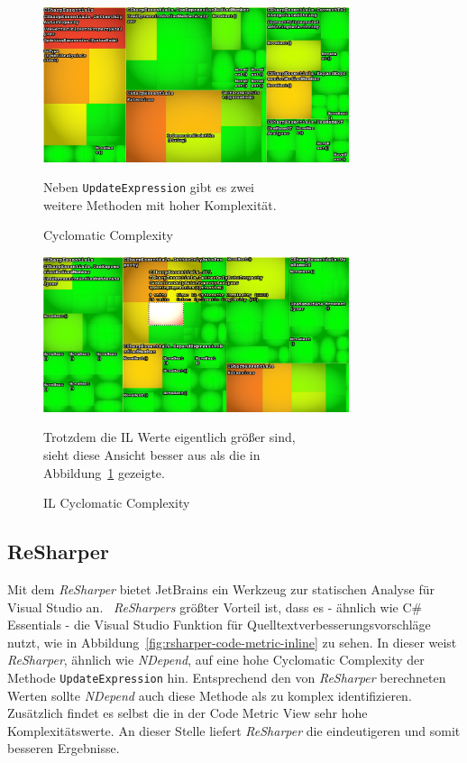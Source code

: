 \begin{figure}[!ht]
	\centering
	\includegraphics[width=0.8\textwidth]{images/nd-cyclomatic-complexity.png}
	\caption{Cyclomatic Complexity}
	\vspace{0.1cm}
	Neben \texttt{UpdateExpression} gibt es zwei\\ weitere Methoden mit hoher Komplexität.
	\label{fig:nd-cyclomatic-complexity}
\end{figure}

\begin{figure}[!ht]
	\centering
	\includegraphics[width=0.8\textwidth]{images/nd-il-cyclomatic-complexity.png}
	\caption{IL Cyclomatic Complexity}
	\vspace{0.1cm}
	Trotzdem die IL Werte eigentlich größer sind, \\
	sieht diese Ansicht besser aus als die in \\ Abbildung~\ref{fig:nd-cyclomatic-complexity} gezeigte.
	\label{fig:nd-il-cyclomatic-complexity}
\end{figure}

\subsection{ReSharper}
Mit dem \emph{ReSharper} bietet JetBrains ein Werkzeug zur statischen Analyse für Visual Studio an.~\cite{resharper} \emph{ReSharpers} größter Vorteil ist, dass es - ähnlich wie C\# Essentials - die Visual Studio Funktion für Quelltextverbesserungsvorschläge nutzt, wie in Abbildung~\ref{fig:rsharper-code-metric-inline} zu sehen. In dieser weist \emph{ReSharper}, ähnlich wie \emph{NDepend}, auf eine hohe Cyclomatic Complexity der Methode \texttt{UpdateExpression} hin. Entsprechend den von \emph{ReSharper} berechneten Werten sollte \emph{NDepend} auch diese Methode als zu komplex identifizieren. Zusätzlich findet es selbst die in der Code Metric View sehr hohe Komplexitätswerte. An dieser Stelle liefert \emph{ReSharper} die eindeutigeren und somit besseren Ergebnisse.

